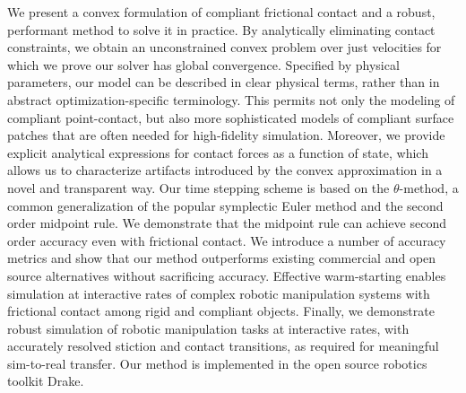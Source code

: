 We present a convex formulation of compliant frictional contact and a robust, 
performant method to solve it in practice. By analytically eliminating contact
constraints, we obtain an unconstrained convex problem over just velocities
for which we prove our solver has global convergence. Specified by physical parameters, our model can be described in clear
physical terms, rather than in abstract optimization-specific terminology. This permits not only the modeling of compliant point-contact, but also more sophisticated models of compliant surface patches 
that are often needed for high-fidelity simulation. 
Moreover, we provide explicit analytical
expressions for contact forces as a function of state, which allows us to
characterize artifacts introduced by the convex approximation in a novel and
transparent way.
Our time stepping scheme
is based on the $\theta\text{-method}$, a common generalization
of the popular symplectic Euler method and the second order
midpoint rule. We demonstrate that the midpoint rule can achieve second order
accuracy even with frictional contact. We introduce a number of accuracy metrics
and show that our method outperforms existing commercial and open source
alternatives without sacrificing accuracy.
Effective warm-starting
enables simulation at interactive rates of complex robotic manipulation systems
with frictional contact among rigid and compliant objects. 
Finally, we demonstrate robust
simulation of robotic manipulation tasks at interactive rates, with accurately
resolved stiction and contact transitions, as required for meaningful
sim-to-real transfer. Our method is implemented in the open source robotics
toolkit Drake.
